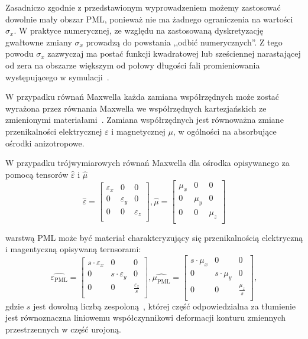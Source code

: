 Zasadniczo zgodnie z przedstawionym wyprowadzeniem możemy zastosować dowolnie mały obszar PML, ponieważ nie ma żadnego ograniczenia na wartości $\sigma_x$. W praktyce numerycznej, ze względu na zastosowaną dyskretyzację gwałtowne zmiany $\sigma_x$ prowadzą do powstania ,,odbić numerycznych''. Z tego powodu $\sigma_x$ zazwyczaj ma postać funkcji kwadratowej lub sześciennej narastającej od zera na obszarze większym od połowy długości fali promieniowania występującego w symulacji~\cite{johnson2008notes}.

W przypadku równań Maxwella każda zamiana współrzędnych może zostać wyrażona przez równania Maxwella we współrzędnych kartezjańskich ze zmienionymi materiałami~\cite{ward1996refraction}. Zamiana współrzędnych jest równoważna zmiane przenikalności elektrycznej $\varepsilon$ i magnetycznej $\mu$, w ogólności na absorbujące ośrodki anizotropowe. 

W przypadku trójwymiarowych równań Maxwella dla ośrodka opisywanego za pomocą tensorów $\hat{\varepsilon}$ i $\hat{\mu}$ 
\begin{equation}
\hat{\varepsilon}=
\begin{bmatrix}
\varepsilon_x & 0 & 0 \\
0 &\varepsilon_y & 0 \\
0 & 0  & \varepsilon_z  \\
\end{bmatrix}
, \hat{\mu}=
\begin{bmatrix}
\mu_x & 0 & 0 \\
0 &\mu_y & 0 \\
0 & 0  & \mu_z  \\
\end{bmatrix}
\end{equation}

warstwą PML może być materiał charakteryzujący się przenikalnością elektryczną i magentyczną opisywaną ternsorami:
\begin{equation}
\hat{\varepsilon_{\textrm{PML}}}=
\begin{bmatrix}
s \cdot \varepsilon_x & 0 & 0 \\
0 &s \cdot \varepsilon_y & 0 \\
0 & 0  & \frac{ \varepsilon_z}{s}  \\
\end{bmatrix}
, \hat{\mu_{\textrm{PML}}}=
\begin{bmatrix}
s \cdot \mu_x & 0 & 0 \\
0 & s \cdot \mu_y & 0 \\
0 & 0  & \frac{\mu_z}{s}  \\
\end{bmatrix},
\label{eq:general-pml-form}
\end{equation}
gdzie $s$ jest dowolną liczbą zespoloną~\cite{sacks1995perfectly}, której część odpowiedzialna za tłumienie jest równoznaczna liniowemu współczynnikowi deformacji konturu zmiennych przestrzennych w część urojoną.


